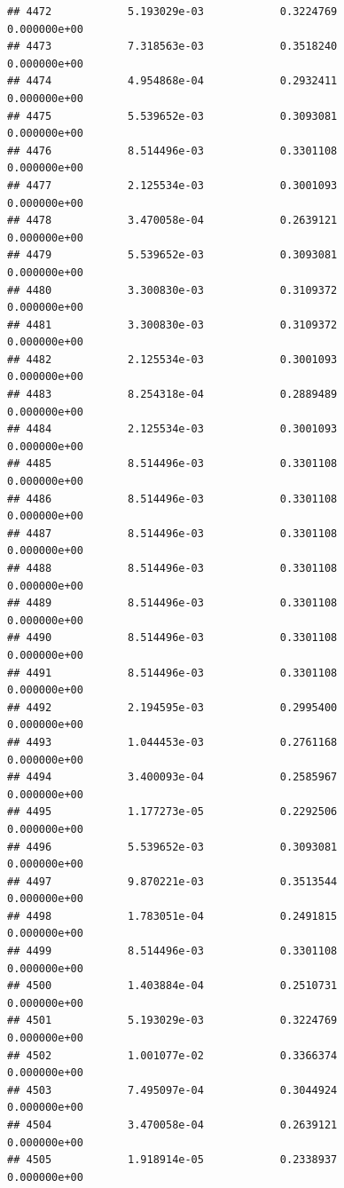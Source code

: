 \documentclass[
]{article}
\begin{document}
\begin{verbatim}
## 4472            5.193029e-03            0.3224769            0.000000e+00
## 4473            7.318563e-03            0.3518240            0.000000e+00
## 4474            4.954868e-04            0.2932411            0.000000e+00
## 4475            5.539652e-03            0.3093081            0.000000e+00
## 4476            8.514496e-03            0.3301108            0.000000e+00
## 4477            2.125534e-03            0.3001093            0.000000e+00
## 4478            3.470058e-04            0.2639121            0.000000e+00
## 4479            5.539652e-03            0.3093081            0.000000e+00
## 4480            3.300830e-03            0.3109372            0.000000e+00
## 4481            3.300830e-03            0.3109372            0.000000e+00
## 4482            2.125534e-03            0.3001093            0.000000e+00
## 4483            8.254318e-04            0.2889489            0.000000e+00
## 4484            2.125534e-03            0.3001093            0.000000e+00
## 4485            8.514496e-03            0.3301108            0.000000e+00
## 4486            8.514496e-03            0.3301108            0.000000e+00
## 4487            8.514496e-03            0.3301108            0.000000e+00
## 4488            8.514496e-03            0.3301108            0.000000e+00
## 4489            8.514496e-03            0.3301108            0.000000e+00
## 4490            8.514496e-03            0.3301108            0.000000e+00
## 4491            8.514496e-03            0.3301108            0.000000e+00
## 4492            2.194595e-03            0.2995400            0.000000e+00
## 4493            1.044453e-03            0.2761168            0.000000e+00
## 4494            3.400093e-04            0.2585967            0.000000e+00
## 4495            1.177273e-05            0.2292506            0.000000e+00
## 4496            5.539652e-03            0.3093081            0.000000e+00
## 4497            9.870221e-03            0.3513544            0.000000e+00
## 4498            1.783051e-04            0.2491815            0.000000e+00
## 4499            8.514496e-03            0.3301108            0.000000e+00
## 4500            1.403884e-04            0.2510731            0.000000e+00
## 4501            5.193029e-03            0.3224769            0.000000e+00
## 4502            1.001077e-02            0.3366374            0.000000e+00
## 4503            7.495097e-04            0.3044924            0.000000e+00
## 4504            3.470058e-04            0.2639121            0.000000e+00
## 4505            1.918914e-05            0.2338937            0.000000e+00

\end{verbatim}
\end{document}

